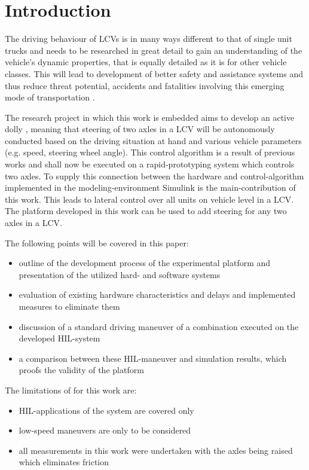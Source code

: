 \documentclass[root.tex]{subfiles}
\begin{document}
{\pagestyle{empty}}
\section{Introduction}
\label{chap:introduction}
\glsresetall
The driving behaviour of \glspl{LCV} is in many ways different to that of single unit trucks and needs to be researched in great detail to gain an understanding of the vehicle's dynamic properties, that is equally detailed as it is for other vehicle classes. This will lead to development of better safety and assistance systems and thus reduce threat potential, accidents and fatalities involving this emerging mode of transportation \cite{performance_improvement}.

The research project in which this work is embedded aims to develop an active dolly \cite{islam2015inverse, islam2015improve}, meaning that steering of two axles in a \gls{LCV} will be autonomously conducted based on the driving situation at hand and various vehicle parameters (e.g. speed, steering wheel angle). 
This control algorithm is a result of previous works and shall now be executed on a rapid-prototyping system which controls two axles. To supply this connection between the hardware and control-algorithm implemented in the modeling-environment Simulink is the main-contribution of this work. This leads to lateral control over all units on vehicle level in a \gls{LCV}. The platform developed in this work can be used to add steering for any two axles in a \gls{LCV}.



The following points will be covered in this paper:
\begin{itemize}
	\item outline of the development process of the experimental platform and presentation of the utilized hard- and software systems 
	\item evaluation of existing hardware characteristics and delays and implemented measures to eliminate them
	\item discussion of a standard driving maneuver of a combination executed on the  developed \gls{HIL}-system 
	\item a comparison between these \gls{HIL}-maneuver and simulation results, which proofs the validity of the platform
	
\end{itemize}

The limitations of for this work are: 

\begin{itemize}
	\item \gls{HIL}-applications of the system are covered only
	\item low-speed maneuvers are only to be considered
	\item all measurements in this work were undertaken with the axles being raised which eliminates friction
\end{itemize}
\end{document}
